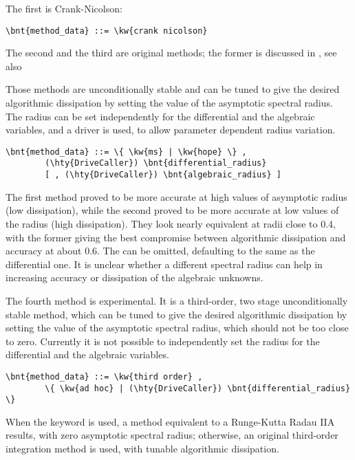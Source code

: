 The first is Crank-Nicolson:
\begin{Verbatim}[commandchars=\\\{\}]
    \bnt{method_data} ::= \kw{crank nicolson}
\end{Verbatim}

The second and the third are original 
methods; the former is discussed in \cite{MASARATI-LANZ-MANTEGAZZA-2001},
see also
\begin{quote}
\end{quote} 
Those methods are unconditionally stable and can be tuned to give 
the desired algorithmic dissipation
by setting the value of the asymptotic spectral radius.
The radius can be set independently for the differential
and the algebraic variables, and a driver is used, to allow parameter 
dependent radius variation.
\begin{Verbatim}[commandchars=\\\{\}]
    \bnt{method_data} ::= \{ \kw{ms} | \kw{hope} \} ,
        (\hty{DriveCaller}) \bnt{differential_radius}
        [ , (\hty{DriveCaller}) \bnt{algebraic_radius} ]
\end{Verbatim}
The first method proved to be more accurate at high values of asymptotic
radius (low dissipation), while the second proved to be more accurate
at low values of the radius (high dissipation).
They look nearly equivalent at radii close to 0.4, with the former
giving the best compromise between algorithmic dissipation and accuracy 
at about 0.6.
The  can be omitted, defaulting to the same 
as the differential one.
It is unclear whether a different spectral radius can help in increasing
accuracy or dissipation of the algebraic unknowns.

The fourth method is experimental. It is a third-order,
two stage unconditionally stable method, which can be tuned to give 
the desired algorithmic dissipation by setting the value 
of the asymptotic spectral radius, which should not be 
too close to zero.
Currently it is not possible to independently set the radius 
for the differential and the algebraic variables.
\begin{Verbatim}[commandchars=\\\{\}]
    \bnt{method_data} ::= \kw{third order} ,
        \{ \kw{ad hoc} | (\hty{DriveCaller}) \bnt{differential_radius} \}
\end{Verbatim}
When the keyword  is used, a method equivalent
to a Runge-Kutta Radau IIA results, with zero asymptotic
spectral radius; otherwise, an original third-order
integration method is used, with tunable algorithmic dissipation.

